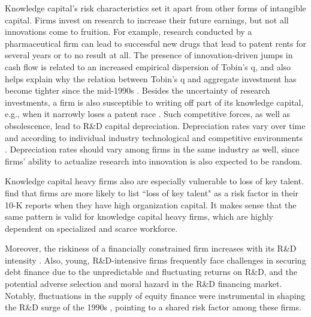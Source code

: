 \documentclass[12pt, letterpaper]{article}
\begin{document}
Knowledge capital's risk characteristics set it apart from other forms of intangible capital. Firms invest on research to increase their future earnings, but not all innovations come to fruition. For example, research conducted by a pharmaceutical firm can lead to successful new drugs that lead to patent rents for several years or to no result at all. The presence of innovation-driven jumps in cash flow is related to an increased empirical dispersion of Tobin's q, and also helps explain why the relation between Tobin's q and aggregate investment has become tighter since the mid-1990s \citep{Andrei2019-bh}. Besides the uncertainty of research investments, a firm is also susceptible to writing off part of its knowledge capital, e.g., when it narrowly loses a patent race \citep{Peters2017-fl}. Such competitive forces, as well as obsolescence, lead to R\&D capital depreciation. Depreciation rates vary over time and according to individual industry technological and competitive environments \citep{Li2020-xc}. Depreciation rates should vary among firms in the same industry as well, since firms' ability to actualize research into innovation is also expected to be random.



Knowledge capital heavy firms also are especially vulnerable to loss of key talent. \cite{Eisfeldt2013-ad} find that firms are more likely to list ``loss of key talent" as a risk factor in their 10-K reports when they have high organization capital. It makes sense that the same pattern is valid for knowledge capital heavy firms, which are highly dependent on specialized and scarce workforce. 

Moreover, the riskiness of a financially constrained firm increases with its R\&D intensity \citep{Li2011-ay}. Also, young, R\&D-intensive firms frequently face challenges in securing debt finance due to the unpredictable and fluctuating returns on R\&D, and the potential adverse selection and moral hazard in the R\&D financing market. Notably, fluctuations in the supply of equity finance were instrumental in shaping the R\&D surge of the 1990s \citep{Brown2009-zp}, pointing to a shared risk factor among these firms.

\end{document}
